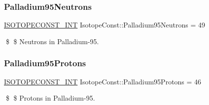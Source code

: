 \subsubsection{\texorpdfstring{Palladium95\+Neutrons}{Palladium95Neutrons}}
{\footnotesize\ttfamily \mbox{\hyperlink{group___isotope_const-_macros_ga5f18360b3e99483a35c32d789e62621c}{I\+S\+O\+T\+O\+P\+E\+C\+O\+N\+S\+T\+\_\+\+I\+NT}} Isotope\+Const\+::\+Palladium95\+Neutrons = 49}

\$ \$ Neutrons in Palladium-\/95. \mbox{\label{group___isotope_const-_palladium-_pd95_ga4625188db78e4cc0edc276b888cc2b56}} 
\subsubsection{\texorpdfstring{Palladium95\+Protons}{Palladium95Protons}}
{\footnotesize\ttfamily \mbox{\hyperlink{group___isotope_const-_macros_ga5f18360b3e99483a35c32d789e62621c}{I\+S\+O\+T\+O\+P\+E\+C\+O\+N\+S\+T\+\_\+\+I\+NT}} Isotope\+Const\+::\+Palladium95\+Protons = 46}

\$ \$ Protons in Palladium-\/95. 